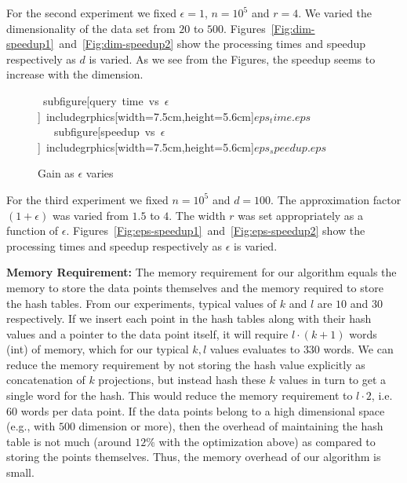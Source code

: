 \documentclass[12pt]{article}
\begin{document}
For the second experiment we fixed $\epsilon = 1$, $n = 10^5$ and
$r = 4$. We varied the dimensionality of the data set from $20$ to
$500$. Figures~\ref{Fig:dim-speedup1}~and~\ref{Fig:dim-speedup2}
show the processing times and speedup respectively as $d$ is
varied. As we see from the Figures, the speedup seems to increase
with the dimension. 

\begin{figure}[t]
\begin{center}
\mbox{
subfigure[query time vs $\epsilon$]{
includegrphics[width=7.5cm,height=5.6cm]{$eps_time.eps$}
\label{Fig:eps-speedup1}
} \quad
subfigure[speedup vs $\epsilon$]{
includegrphics[width=7.5cm,height=5.6cm]{$eps_speedup.eps$}
\label{Fig:eps-speedup2}
}
}
\caption{Gain as $\epsilon$ varies}
\label{Fig:eps-speedup}
\end{center}
\end{figure}

For the third experiment we fixed $n = 10^5$ and $d = 100$. The
approximation factor $(1+\epsilon)$ was varied from $1.5$ to $4$.
The width $r$ was set appropriately as a function of $\epsilon$.
Figures~\ref{Fig:eps-speedup1}~and~\ref{Fig:eps-speedup2} show the
processing times and speedup respectively as $\epsilon$ is varied.

{\noindent \bf Memory Requirement:} The memory requirement for our
algorithm equals the memory to store the data points themselves
and the memory required to store the hash tables. From our
experiments, typical values of $k$ and $l$ 
are $10$ and $30$ respectively. If we insert each point
in the hash tables along with their hash values and a pointer to
the data point itself, it will require $l\cdot(k+1)$ words (int)
of memory, which for our typical $k,l$ values evaluates to $330$
words. We can reduce the memory requirement by not storing the
hash value explicitly as concatenation of $k$ projections, but
instead hash these $k$ values in turn to get a single word for the
hash. This would reduce the memory requirement to $l\cdot 2$, i.e.
$60$ words per data point. If the data points belong to a high
dimensional space (e.g., with $500$ dimension or more), then
the overhead of maintaining the hash table is not much (around
$12\%$ with the optimization above) as compared to storing the
points themselves. Thus, the memory overhead of our algorithm is
small. 
\end{document}
